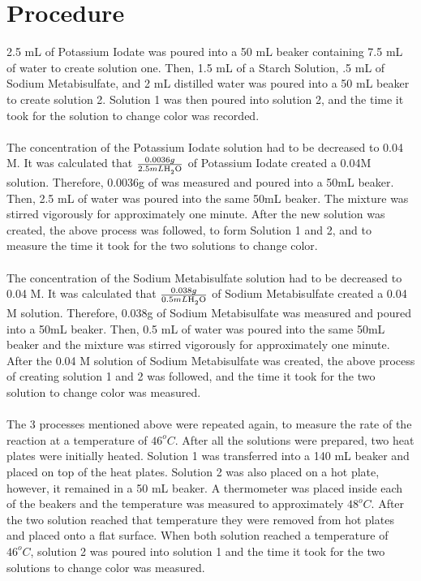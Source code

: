 \documentclass{article}
\begin{document}
\section*{Procedure} %
2.5 mL of Potassium Iodate was poured into a 50 mL beaker containing 7.5 mL of water to create solution one. Then, 1.5 mL of a Starch Solution, .5 mL of Sodium Metabisulfate, and 2 mL distilled water was poured into a 50 mL beaker to create solution 2. Solution 1 was then poured into solution 2, and the time it took for the solution to change color was recorded. \\\\
The concentration of the Potassium Iodate solution had to be decreased to 0.04 M. It was calculated that $\frac{0.0036g}{2.5mL \ce{H_2O}}$ of Potassium Iodate created a 0.04M solution. Therefore, 0.0036g of  was measured and poured into a 50mL beaker. Then, 2.5 mL of water was poured into the same 50mL beaker. The mixture was stirred vigorously for approximately one minute. After the new  solution was created, the above process was followed, to form Solution 1 and 2, and to measure the time it took for the two solutions to change color. \\\\
The concentration of the Sodium Metabisulfate solution had to be decreased to 0.04 M. It was calculated that $\frac{0.038g}{0.5mL \ce{H_2O}}$ of Sodium Metabisulfate created a 0.04 M solution. Therefore, 0.038g of Sodium Metabisulfate was measured and poured into a 50mL beaker. Then, 0.5 mL of water was poured into the same 50mL beaker and the mixture was stirred vigorously for approximately one minute. After the 0.04 M solution of Sodium Metabisulfate was created, the above process of creating solution 1 and 2 was followed, and the time it took for the two solution to change color was measured.  \\\\
The 3 processes mentioned above were repeated again, to measure the rate of the reaction at a temperature of $46^o C$. After all the solutions were prepared, two heat plates were initially heated. Solution 1 was transferred into a 140 mL beaker and placed on top of the heat plates. Solution 2 was also placed on a hot plate, however, it remained in a 50 mL beaker. A thermometer was placed inside each of the beakers and the temperature was measured to approximately $48^o C$. After the two solution reached that temperature they were removed from hot plates and placed onto a flat surface. When both solution reached a temperature of $46^o C$, solution 2 was poured into solution 1 and the time it took for the two solutions to change color was measured. 
\end{document}
